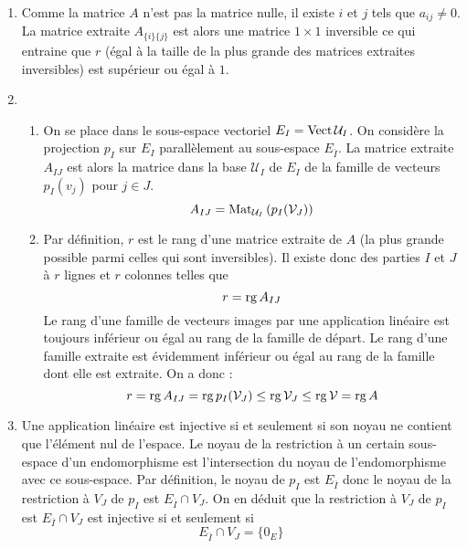 \begin{enumerate}
 \item Comme la matrice $A$ n'est pas la matrice nulle, il existe $i$ et $j$ tels que $a_{ij}\neq 0$. La matrice extraite $A_{\{i\}\{j\}}$ est alors une matrice $1\times 1$ inversible ce qui entraine que $r$ (égal à la taille de la plus grande des matrices extraites inversibles) est supérieur ou égal à $1$.

 \item \begin{enumerate}
 \item On se place dans le sous-espace vectoriel $E_I = \operatorname{Vect} \mathcal U_I$.\newline
On considère la projection $p_I$ sur $E_I$ parallèlement au sous-espace $E_{\overline{I}}$. La matrice extraite $A_{IJ}$ est alors la matrice dans la base $\mathcal U_I$ de $E_I$ de la famille de vecteurs $p_I(v_j)$ pour $j\in J$.
\begin{displaymath}
 A_{IJ} = \operatorname{Mat}_{\mathcal U_I}\left( p_I(\mathcal V_J)\right) 
\end{displaymath}
\item Par définition, $r$ est le rang d'une matrice extraite de $A$ (la plus grande possible parmi celles qui sont inversibles). Il existe donc des parties $I$ et $J$ à $r$ lignes et $r$ colonnes telles que 
\begin{displaymath}
 r = \operatorname{rg} A_{IJ}
\end{displaymath}
Le rang d'une famille de vecteurs images par une application linéaire est toujours inférieur ou égal au rang de la famille de départ. Le rang d'une famille extraite est évidemment inférieur ou égal au rang de la famille dont elle est extraite. On a donc :
\begin{displaymath}
 r = \operatorname{rg} A_{IJ} = \operatorname{rg}  p_I(\mathcal V_J) \leq \operatorname{rg} \mathcal V_J \leq \operatorname{rg} \mathcal V = \operatorname{rg} A
\end{displaymath}
\end{enumerate}
\item Une application linéaire est injective si et seulement si son noyau ne contient que l'élément nul de l'espace.\newline
Le noyau de la restriction à un certain sous-espace d'un endomorphisme est l'intersection du noyau de l'endomorphisme avec ce sous-espace.\newline
Par définition, le noyau de $p_I$ est $E_{\overline{I}}$ donc le noyau de la restriction à $V_J$ de $p_I$ est $E_{\overline{I}}\cap V_J$. On en déduit que la restriction à $V_J$ de $p_I$ est $E_{\overline{I}}\cap V_J$ est injective si et seulement si
\begin{displaymath}
E_{\overline{I}}\cap V_J = \{0_E\} 
\end{displaymath}


\end{enumerate}
